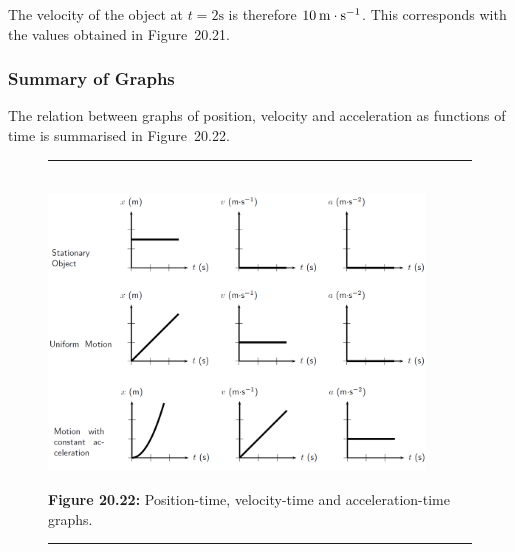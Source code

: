     
          
          \label{m38795*id72897}The velocity of the object at \begin{math}t=2\mathrm{s}\end{math} is therefore \begin{math}10\phantom{\rule{2pt}{0ex}}\mathrm{m}\ensuremath{\cdot}\mathrm{s}{}^{-1}\end{math}. This corresponds with the values obtained in Figure~20.21.\par 

        
      
 
    \label{m38795*cid8}
            \subsubsection{ Summary of Graphs}
            \nopagebreak
            \label{m38795*id73116}The relation between graphs of position, velocity and acceleration as functions of time is summarised in Figure~20.22.\par 
      
    \setcounter{subfigure}{0}


	\begin{figure}[H] %
    \begin{center}
    \rule[.1in]{\figurerulewidth}{.005in} \\
        \label{m38795*id73150!!!underscore!!!media}\label{m38795*id73150!!!underscore!!!printimage}\includegraphics[width=10cm]{col11305.imgs/m38795_PG10C2_029_1.png} %
        
      \vspace{2pt}
    \vspace{\rubberspace}\par \begin{cnxcaption}
	  \small \textbf{Figure 20.22: }Position-time, velocity-time and acceleration-time graphs.
	\end{cnxcaption}
      
    \vspace{.1in}
    \rule[.1in]{\figurerulewidth}{.005in} \\
        
    \end{center}

 \end{figure}   

